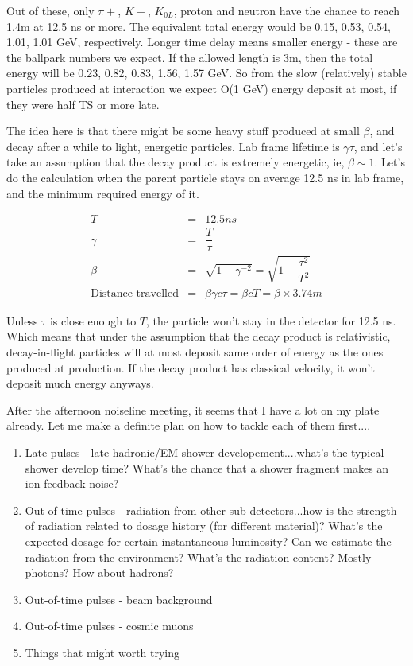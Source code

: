Out of these, only $\pi+$, $K+$, $K_{0L}$, proton and neutron have the chance to reach 1.4m at 12.5 ns or more.
The equivalent total energy would be 0.15, 0.53, 0.54, 1.01, 1.01 GeV, respectively.
Longer time delay means smaller energy - these are the ballpark numbers we expect.
If the allowed length is 3m, then the total energy will be 0.23, 0.82, 0.83, 1.56, 1.57 GeV.
So from the slow (relatively) stable particles produced at interaction
we expect O(1 GeV) energy deposit at most, if they were half TS or more late.


The idea here is that there might be some heavy stuff produced at small $\beta$, and decay after a while to light, energetic particles.
Lab frame lifetime is $\gamma \tau$, and let's take an assumption that the decay product is extremely energetic, ie, $\beta \sim 1$.
Let's do the calculation when the parent particle stays on average 12.5 ns in lab frame, and the minimum required energy of it.

\begin{eqnarray}
T &=& 12.5 ns\nonumber\\
\gamma &=& \dfrac{T}{\tau}\nonumber\\
\beta &=& \sqrt{1 - \gamma^{-2}} = \sqrt{1 - \dfrac{\tau^2}{T^2}}\nonumber\\
\text{Distance travelled} &=& \beta \gamma c \tau = \beta c T = \beta \times 3.74 m\nonumber
\end{eqnarray}

Unless $\tau$ is close enough to $T$, the particle won't stay in the detector for 12.5 ns.  Which means that under the assumption that
the decay product is relativistic, decay-in-flight particles will at most deposit same order of energy as the ones produced at production.
If the decay product has classical velocity, it won't deposit much energy anyways.


After the afternoon noiseline meeting, it seems that I have a lot on my plate already.  Let me make a definite plan on how to tackle each of them first....

\begin{enumerate}
\item Late pulses - late hadronic/EM shower-developement....what's the typical shower develop time?  What's the chance that a shower fragment makes an ion-feedback noise?
\item Out-of-time pulses - radiation from other sub-detectors...how is the strength of radiation related to dosage history (for different material)?  What's the expected dosage for certain
instantaneous luminosity?  Can we estimate the radiation from the environment?  What's the radiation content?  Mostly photons?  How about hadrons?
\item Out-of-time pulses - beam background
\item Out-of-time pulses - cosmic muons
\item Things that might worth trying
\end{enumerate}

